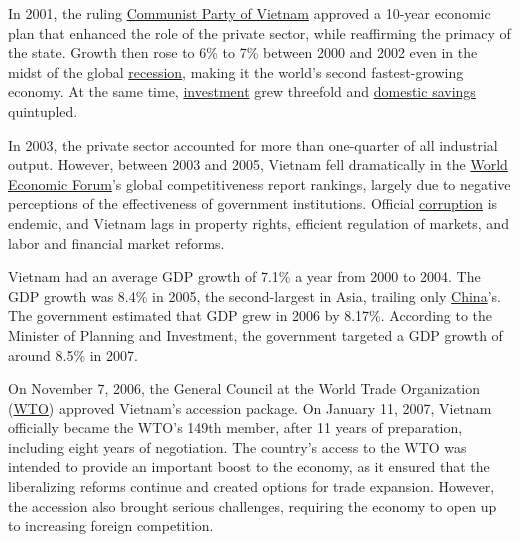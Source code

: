 \documentclass[openany]{book}
\begin{document}
In 2001, the ruling \href{https://en.wikipedia.org/wiki/Communist_Party_of_Vietnam}{Communist Party of Vietnam} approved a 10-year economic plan that enhanced the role of the private sector, while reaffirming the primacy of the state.\cite{36} Growth then rose to 6\% to 7\% between 2000 and 2002 even in the midst of the global \href{https://en.wikipedia.org/wiki/Recession}{recession}, making it the world's second fastest-growing economy. At the same time, \href{https://en.wikipedia.org/wiki/Investment}{investment} grew threefold and \href{https://en.wikipedia.org/wiki/Domestic_savings}{domestic savings} quintupled.\cite{50}

In 2003, the private sector accounted for more than one-quarter of all industrial output.\cite{36} However, between 2003 and 2005, Vietnam fell dramatically in the \href{https://en.wikipedia.org/wiki/World_Economic_Forum}{World Economic Forum}'s global competitiveness report rankings, largely due to negative perceptions of the effectiveness of government institutions.\cite{36} Official \href{https://en.wikipedia.org/wiki/Political_corruption}{corruption} is endemic, and Vietnam lags in property rights, efficient regulation of markets, and labor and financial market reforms.\cite{36}

Vietnam had an average GDP growth of 7.1\% a year from 2000 to 2004. The GDP growth was 8.4\% in 2005, the second-largest in Asia, trailing only \href{https://en.wikipedia.org/wiki/China}{China}'s. The government estimated that GDP grew in 2006 by 8.17\%. According to the Minister of Planning and Investment, the government targeted a GDP growth of around 8.5\% in 2007.\cite{51}

On November 7, 2006, the General Council at the World Trade Organization (\href{https://en.wikipedia.org/wiki/WTO}{WTO}) approved Vietnam's accession package. On January 11, 2007, Vietnam officially became the WTO's 149th member, after 11 years of preparation, including eight years of negotiation.\cite{44} The country's access to the WTO was intended to provide an important boost to the economy, as it ensured that the liberalizing reforms continue and created options for trade expansion. However, the accession also brought serious challenges, requiring the economy to open up to increasing foreign competition.\cite{52}\cite{53}
\end{document}
